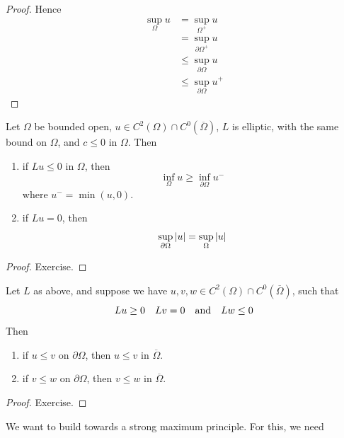 \documentclass{article}
\begin{document}
\begin{proof}
    Hence
    \begin{align*}
        \sup_\Omega u &= \sup_{\Omega^+} u \\
        &= \sup_{\partial\Omega^+} u \\
        &\le \sup_{\partial\Omega} u \\
        &\le \sup_{\partial\Omega} u^+
    \end{align*}
\end{proof}

\begin{corollary}
    Let \(\Omega\) be bounded open, \(u \in C^2(\Omega) \cap C^0(\overline\Omega)\), \(L\) is elliptic, with the same bound on \(\Omega\), and \(c \le 0\) in \(\Omega\). Then
    \begin{enumerate}
        \item if \(Lu \le 0\) in \(\Omega\), then
        \[\inf_{\Omega} u \ge \inf_{\partial\Omega} u^-\]
        where \(u^- = \min(u, 0)\).
        \item if \(Lu = 0\), then
        \[\sup_{\partial\Omega}\abs{u} = \sup_\Omega \abs{u}\]
    \end{enumerate}
\end{corollary}

\begin{proof}
    Exercise.
\end{proof}

\begin{corollary}
    Let \(L\) as above, and suppose we have \(u, v, w \in C^2(\Omega) \cap C^0(\overline\Omega)\), such that
    \[Lu\ge 0 \quad Lv = 0 \qqtext{and} Lw \le 0\]
    Then
    \begin{enumerate}
        \item if \(u \le v\) on \(\partial\Omega\), then \(u \le v\) in \(\overline{\Omega}\).
        \item if \(v \le w\) on \(\partial\Omega\), then \(v \le w\) in \(\overline{\Omega}\).
    \end{enumerate}
\end{corollary}

\begin{proof}
    Exercise.
\end{proof}

We want to build towards a strong maximum principle. For this, we need
\end{document}
